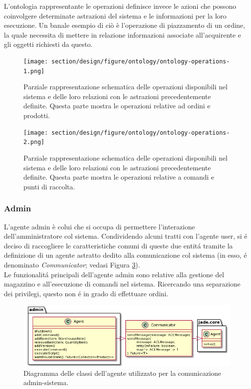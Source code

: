 %
\parag
L'ontologia rappresentante le operazioni definisce invece le azioni che possono coinvolgere determinate astrazioni del sistema e le informazioni per la loro esecuzione. Un banale esempio di ciò è l'operazione di piazzamento di un ordine, la quale necessita di mettere in relazione informazioni associate all'acquirente e gli oggetti richiesti da questo.
\begin{figure}[!ht]\centering
    \texttt{[image: section/design/figure/ontology/ontology-operations-1.png]}%
    \caption{Parziale rappresentazione schematica delle operazioni disponibili nel sistema e delle loro relazioni con le astrazioni precedentemente definite. Questa parte mostra le operazioni relative ad ordini e prodotti.}
    \label{fig:ontology_operations-1}
\end{figure}
\begin{figure}[!ht]\centering
    \texttt{[image: section/design/figure/ontology/ontology-operations-2.png]}%
    \caption{Parziale rappresentazione schematica delle operazioni disponibili nel sistema e delle loro relazioni con le astrazioni precedentemente definite. Questa parte mostra le operazioni relative a comandi e punti di raccolta.}
    \label{fig:ontology_operations-2}
\end{figure}%

\subsubsection{Admin}
L'agente admin \`e colui che si occupa di permettere l'interazione dell'amministratore col sistema. Condividendo alcuni tratti con l'agente user, si \'e deciso di raccogliere le caratteristiche comuni di queste due entit\'a tramite la definizione di un agente astratto dedito alla comunicazione col sistema (in esso, \'e denominato \textit{Communicator}; vedasi Figura \ref{fig:class_diagram_admin_agent}).\\
Le funzionalit\'a principali dell'agente admin sono relative alla gestione del magazzino e all'esecuzione di comandi nel sistema. Ricercando una separazione dei privilegi, questo non \'e in grado di effettuare ordini.
\begin{figure}[ht]
    \includegraphics[width=\textwidth]{section/design/figure/admin/class_diagram.png}
    \caption{Diagramma delle classi dell'agente utilizzato per la comunicazione admin-sistema.}
    \label{fig:class_diagram_admin_agent}
\end{figure}

